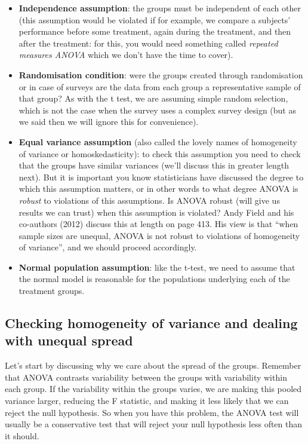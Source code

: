 \documentclass[
]{book}
\begin{document}
\begin{itemize}
\item
  \textbf{Independence assumption}: the groups must be independent of each other (this assumption would be violated if for example, we compare a subjects' performance before some treatment, again during the treatment, and then after the treatment: for this, you would need something called \emph{repeated measures ANOVA} which we don't have the time to cover).
\item
  \textbf{Randomisation condition}: were the groups created through randomisation or in case of surveys are the data from each group a representative sample of that group? As with the t test, we are assuming simple random selection, which is not the case when the survey uses a complex survey design (but as we said then we will ignore this for convenience).
\item
  \textbf{Equal variance assumption} (also called the lovely names of homogeneity of variance or homoskedasticity): to check this assumption you need to check that the groups have similar variances (we'll discuss this in greater length next). But it is important you know statisticians have discussed the degree to which this assumption matters, or in other words to what degree ANOVA is \emph{robust} to violations of this assumptions. Is ANOVA robust (will give us results we can trust) when this assumption is violated? Andy Field and his co-authors (2012) discuss this at length on page 413. His view is that ``when sample sizes are unequal, ANOVA is not robust to violations of homogeneity of variance'', and we should proceed accordingly.
\item
  \textbf{Normal population assumption}: like the t-test, we need to assume that the normal model is reasonable for the populations underlying each of the treatment groups.
\end{itemize}

\subsection{Checking homogeneity of variance and dealing with unequal spread}\label{checking-homogeneity-of-variance-and-dealing-with-unequal-spread}

Let's start by discussing why we care about the spread of the groups. Remember that ANOVA contrasts variability between the groups with variability within each group. If the variability within the groups varies, we are making this pooled variance larger, reducing the F statistic, and making it less likely that we can reject the null hypothesis. So when you have this problem, the ANOVA test will usually be a conservative test that will reject your null hypothesis less often than it should.
\end{document}
